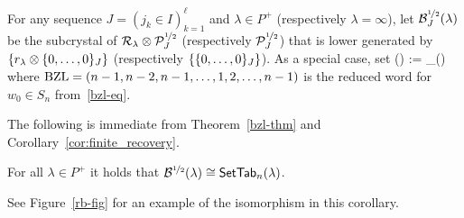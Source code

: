 \documentclass[11pt]{article}
\begin{document}
\begin{definition}
For any sequence $J = (j_k \in I)_{k=1}^{\ell}$ and $\lambda \in P^+$ (respectively $\lambda = \infty$), let $\sqrtB_J(\lambda)$ be the subcrystal of $\cR_{\lambda} \otimes \sqrtE_J$ (respectively $\sqrtE_J$) that is lower generated by $\{ r_{\lambda} \otimes \uj{J}{0, \dotsc, 0} \}$ (respectively $\{ \uj{J}{0,\dotsc,0} \}$).
As a special case, set
\be
\sqrtB(\lambda) := \sqrtB_{\BZL}(\lambda)
\ee
where $\BZL=(n-1,n-2,n-1,\dots,1,2,\dots,n-1)$ is the reduced word for $w_0 \in S_n$ from~\eqref{bzl-eq}.
\end{definition}

The following is immediate from Theorem~\ref{bzl-thm} and Corollary~\ref{cor:finite_recovery}.

\begin{corollary}\label{rb-B-cor}
For all $\lambda \in P^+$ it holds that $\cB^{\halfpower}(\lambda) \iso \SetTab_n(\lambda)$.
\end{corollary}

See Figure~\ref{rb-fig} for an example of the isomorphism in this corollary. 
\end{document}
